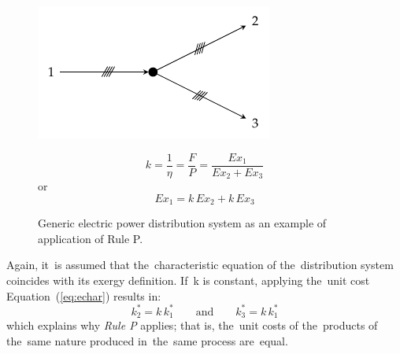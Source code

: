 \documentclass[energies,article,accept,moreauthors,pdftex]{Definitions/mdpi}
\begin{document}
\begin{figure}[ht]
	\begin{minipage}[c]{0.50\linewidth}
		\centering
		\includegraphics[width=0.8\linewidth]{distribucion}
	\end{minipage}
	\begin{minipage}[c]{0.48\linewidth}
		\centering
		\begin{equation*}
		k=\frac{1}{\eta}=\frac{F}{P}=\frac{Ex_1}{Ex_2+Ex_3}
		\label{eq:dist}
		\end{equation*}
		or
		\begin{equation*}
		Ex_1=k\,Ex_2+k\,Ex_3
		\end{equation*}
	\end{minipage}
	\caption{Generic electric power distribution system as an example of application of Rule P.}
	\label{fig:distributor}
\end{figure}

Again, it~is assumed that the~characteristic equation of the~distribution system coincides with its exergy definition. If~k is constant, applying the~unit cost Equation~(\ref{eq:echar}) results in:
\begin{equation}
    k_2^*=k\,k_1^*     \qquad \text{and}\qquad    k_3^*=k\,k_1^*
\end{equation}
which explains why \emph{Rule P} applies; that is, the~unit costs of the~products of the~same nature produced in~the~same process are~equal.
\end{document}
